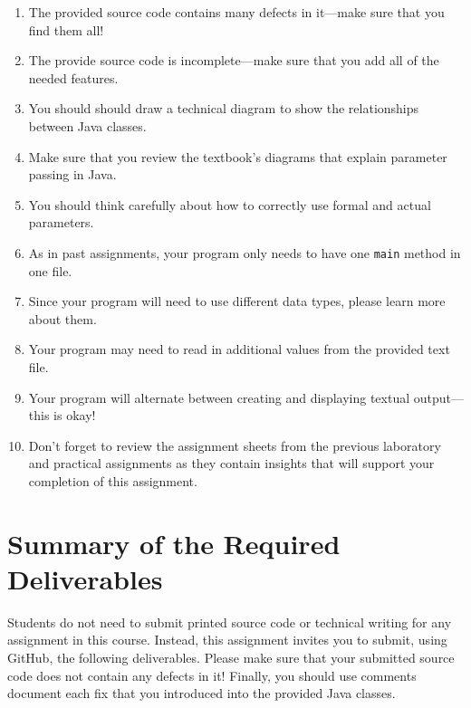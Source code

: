 \documentclass[11pt]{article}
\begin{document}
\begin{enumerate}

\item The provided source code contains many defects in it---make sure that you find them all!

\item The provide source code is incomplete---make sure that you add all of the needed features.

\item You should should draw a technical diagram to show the relationships between Java classes.

\item Make sure that you review the textbook's diagrams that explain parameter
  passing in Java.

\item You should think carefully about how to correctly use formal and actual parameters.

\item As in past assignments, your program only needs to have one {\tt main} method in one file.

\item Since your program will need to use different data types, please learn more about them.

\item Your program may need to read in additional values from the provided text file.

\item Your program will alternate between creating and displaying textual
  output---this is okay!

\item Don't forget to review the assignment sheets from the previous laboratory
  and practical assignments as they contain insights that will support your
  completion of this assignment.

\end{enumerate}

\section*{Summary of the Required Deliverables}

\noindent Students do not need to submit printed source code or technical
writing for any assignment in this course. Instead, this assignment invites you
to submit, using GitHub, the following deliverables. Please make sure that your
submitted source code does not contain any defects in it! Finally, you should
use comments document each fix that you introduced into the provided Java
classes.
\end{document}
